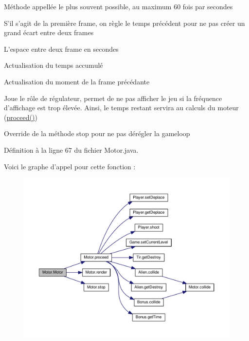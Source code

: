 Méthode appellée le plus souvent possible, au maximum 60 fois par secondes

S'il s'agit de la première frame, on règle le temps précédent pour ne pas créer un grand écart entre deux frames

L'espace entre deux frame en secondes

Actualisation du temps accumulé

Actualisation du moment de la frame précédante

Joue le rôle de régulateur, permet de ne pas afficher le jeu si la fréquence d'affichage est trop élevée. Ainsi, le temps restant servira au calculs du moteur (\hyperlink{class_motor_a5333ff4fde112f55953849964f8ae7fa}{proceed()})

Override de la méthode stop pour ne pas dérégler la gameloop

Définition à la ligne 67 du fichier Motor.\-java.



Voici le graphe d'appel pour cette fonction \-:
\nopagebreak
\begin{figure}[H]
\begin{center}
\leavevmode
\includegraphics[width=350pt]{class_motor_ac2cb95916f7081fef0b4582db086404e_cgraph}
\end{center}
\end{figure}




